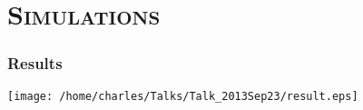 \documentclass[xcolor=x11names,compress]{beamer}
\renewcommand{\(}{\begin{columns}}
\renewcommand{\)}{\end{columns}}
\newcommand{\<}[1]{\begin{column}{#1}}
\renewcommand{\>}{\end{column}}
\begin{document}

\section{\scshape Simulations}

\begin{frame}
\frametitle{Results}
\centering \texttt{[image: /home/charles/Talks/Talk\_2013Sep23/result.eps]}
\end{frame}
\end{document}
